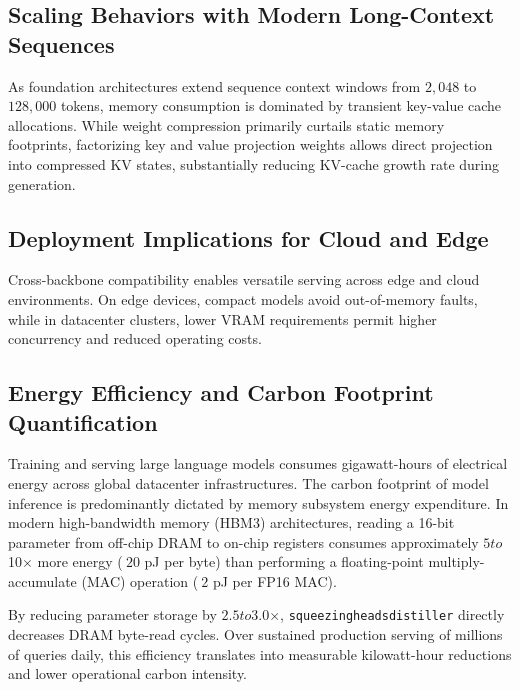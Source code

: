 \subsection{Scaling Behaviors with Modern Long-Context Sequences}
As foundation architectures extend sequence context windows from $2{,}048$ to $128{,}000$ tokens, memory consumption is dominated by transient key-value cache allocations. While weight compression primarily curtails static memory footprints, factorizing key and value projection weights allows direct projection into compressed KV states, substantially reducing KV-cache growth rate during generation.

\subsection{Deployment Implications for Cloud and Edge}
Cross-backbone compatibility enables versatile serving across edge and cloud environments. On edge devices, compact models avoid out-of-memory faults, while in datacenter clusters, lower VRAM requirements permit higher concurrency and reduced operating costs.

\subsection{Energy Efficiency and Carbon Footprint Quantification}
Training and serving large language models consumes gigawatt-hours of electrical energy across global datacenter infrastructures. The carbon footprint of model inference is predominantly dictated by memory subsystem energy expenditure. In modern high-bandwidth memory (HBM3) architectures, reading a 16-bit parameter from off-chip DRAM to on-chip registers consumes approximately $5$\times$ to $10$\times$ more energy ($~20$ pJ per byte) than performing a floating-point multiply-accumulate (MAC) operation ($~2$ pJ per FP16 MAC).

By reducing parameter storage by $2.5$\times$ to $3.0$\times$, \texttt{squeezingheadsdistiller} directly decreases DRAM byte-read cycles. Over sustained production serving of millions of queries daily, this efficiency translates into measurable kilowatt-hour reductions and lower operational carbon intensity.
